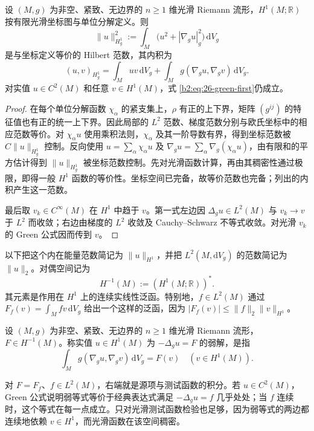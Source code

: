 \begin{proposition}
\label{b2:prop:26-energy-norm}
设 \((M,g)\) 为非空、紧致、无边界的 \(n\geq1\) 维光滑 Riemann 流形，\(H^1(M;\mathbb R)\) 按有限光滑坐标图与单位分解定义。则
\[
 \|u\|_{H_g^1}^2
 :=\int_M\bigl(u^2+|\nabla_g u|_g^2\bigr)\,\mathrm dV_g
\]
是与坐标定义等价的 Hilbert 范数，其内积为
\[
 (u,v)_{H_g^1}
 =\int_Muv\,\mathrm dV_g
   +\int_Mg(\nabla_g u,\nabla_g v)\,\mathrm dV_g.
\]
对实值 \(u\in C^2(M)\) 和任意 \(v\in H^1(M)\)，式
\eqref{b2:eq:26-green-first}仍成立。
\end{proposition}
\begin{proof}
在每个单位分解函数 \(\chi_\alpha\) 的紧支集上，\(\rho\) 有正的上下界，矩阵 \((g^{ij})\) 的特征值也有正的统一上下界。因此局部的 \(L^2\) 范数、梯度范数分别与欧氏坐标中的相应范数等价。对 \(\chi_\alpha u\) 使用乘积法则，\(\chi_\alpha\) 及其一阶导数有界，得到坐标范数被 \(C\|u\|_{H_g^1}\) 控制。反向使用
\(u=\sum_\alpha\chi_\alpha u\) 及
\(\nabla_g u=\sum_\alpha\nabla_g(\chi_\alpha u)\)，由有限和的平方估计得到 \(\|u\|_{H_g^1}\) 被坐标范数控制。先对光滑函数计算，再由其稠密性通过极限，即得一般 \(H^1\) 函数的等价性。坐标空间已完备，故等价范数也完备；列出的内积产生这一范数。

最后取 \(v_k\in C^\infty(M)\) 在 \(H^1\) 中趋于 \(v\)。第一式左边因 \(\Delta_g u\in L^2(M)\) 与 \(v_k\to v\) 于 \(L^2\) 而收敛；右边由梯度的 \(L^2\) 收敛及 Cauchy--Schwarz 不等式收敛。对光滑 \(v_k\) 的 Green 公式因而传到 \(v\)。
\end{proof}

以下把这个内在能量范数简记为 \(\|u\|_{H^1}\)，并把 \(L^2(M,\mathrm dV_g)\) 的范数简记为 \(\|u\|_2\)。对偶空间记为
\[
 H^{-1}(M):=(H^1(M;\mathbb R))^*.
\]
其元素是作用在 \(H^1\) 上的连续实线性泛函。特别地，\(f\in L^2(M)\) 通过
\(F_f(v)=\int_Mfv\,\mathrm dV_g\) 给出一个这样的泛函，因为
\(|F_f(v)|\leq\|f\|_2\|v\|_{H^1}\)。

\begin{definition}
\label{b2:def:26-weak-poisson}
设 \((M,g)\) 为非空、紧致、无边界的 \(n\geq1\) 维光滑 Riemann 流形，\(F\in H^{-1}(M)\)。称实值 \(u\in H^1(M)\) 为 \(-\Delta_gu=F\) 的弱解，是指
\begin{equation}
\label{b2:eq:26-weak-poisson}
 \int_Mg(\nabla_g u,\nabla_g v)\,\mathrm dV_g=F(v)
 \quad(v\in H^1(M)).
\end{equation}
\end{definition}

对 \(F=F_f\)、\(f\in L^2(M)\)，右端就是源项与测试函数的积分。若 \(u\in C^2(M)\)，Green 公式说明弱等式等价于经典表达式满足 \(-\Delta_gu=f\) 几乎处处；当 \(f\) 连续时，这个等式在每一点成立。只对光滑测试函数检验也足够，因为弱等式的两边都连续地依赖 \(v\in H^1\)，而光滑函数在该空间稠密。

